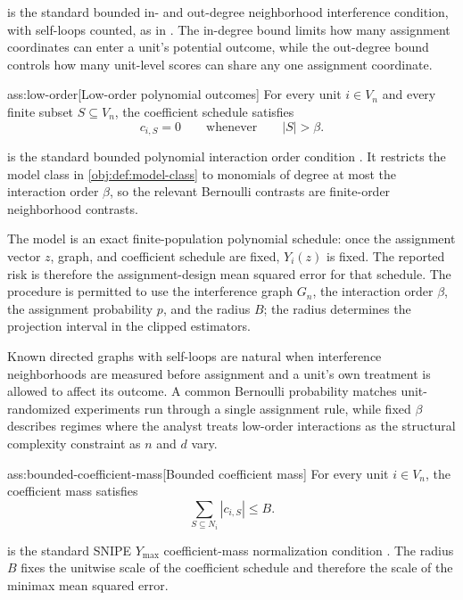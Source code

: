  is the standard bounded in- and out-degree neighborhood interference condition, with self-loops counted, as in \citet{CortezRodriguezEichhornYu2023}. The in-degree bound limits how many assignment coordinates can enter a unit's potential outcome, while the out-degree bound controls how many unit-level scores can share any one assignment coordinate.

\begin{assumptionv}{ass:low-order}[Low-order polynomial outcomes]
For every unit \(i\in V_n\) and every finite subset \(S\subseteq V_n\), the coefficient schedule satisfies
\[
c_{i,S}=0
\qquad\text{whenever}\qquad
|S|>\beta .
\]
\end{assumptionv}

 is the standard bounded polynomial interaction order condition \citep{CortezRodriguezEichhornYu2023}. It restricts the model class in \cref{obj:def:model-class} to monomials of degree at most the interaction order \(\beta\), so the relevant Bernoulli contrasts are finite-order neighborhood contrasts.

The model is an exact finite-population polynomial schedule: once the assignment vector \(z\), graph, and coefficient schedule are fixed, \(Y_i(z)\) is fixed. The reported risk is therefore the assignment-design mean squared error for that schedule. The procedure is permitted to use the interference graph \(G_n\), the interaction order \(\beta\), the assignment probability \(p\), and the radius \(B\); the radius determines the projection interval in the clipped estimators.

Known directed graphs with self-loops are natural when interference neighborhoods are measured before assignment and a unit's own treatment is allowed to affect its outcome. A common Bernoulli probability matches unit-randomized experiments run through a single assignment rule, while fixed \(\beta\) describes regimes where the analyst treats low-order interactions as the structural complexity constraint as \(n\) and \(d\) vary.

\begin{assumptionv}{ass:bounded-coefficient-mass}[Bounded coefficient mass]
For every unit \(i\in V_n\), the coefficient mass satisfies
\[
\sum_{S\subseteq N_i}|c_{i,S}|\le B .
\]
\end{assumptionv}

 is the standard SNIPE \(Y_{\max}\) coefficient-mass normalization condition \citep{CortezRodriguezEichhornYu2023}. The radius \(B\) fixes the unitwise scale of the coefficient schedule and therefore the scale of the minimax mean squared error.

